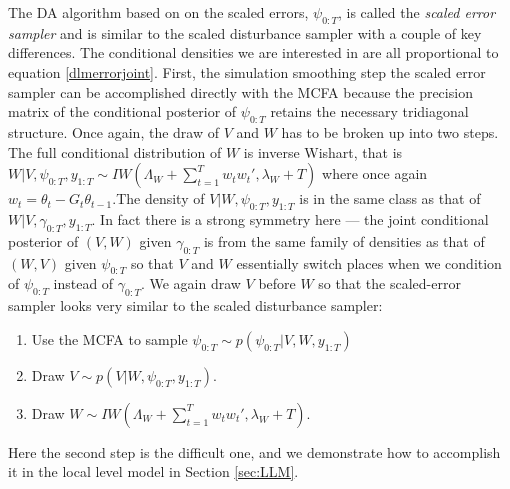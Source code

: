 \documentclass{article}
\begin{document}
The DA algorithm based on on the scaled errors, $\psi_{0:T}$, is called the {\it scaled error sampler} and is similar to the scaled disturbance sampler with a couple of key differences. The conditional densities we are interested in are all proportional to equation \eqref{dlmerrorjoint}. First, the simulation smoothing step the scaled error sampler can be accomplished directly with the MCFA because the precision matrix of the conditional posterior of $\psi_{0:T}$ retains the necessary tridiagonal structure. Once again, the draw of $V$ and $W$ has to be broken up into two steps. The full conditional distribution of $W$ is inverse Wishart, that is $W|V,\psi_{0:T},y_{1:T} \sim IW\left(\Lambda_W + \sum_{t=1}^Tw_tw_t',\lambda_{W} + T\right)$ where once again $w_t = \theta_t - G_t\theta_{t-1}$.The density of $V|W,\psi_{0:T},y_{1:T}$ is in the same class as that of $W|V,\gamma_{0:T},y_{1:T}$. In fact there is a strong symmetry here --- the joint conditional posterior of $(V,W)$ given $\gamma_{0:T}$ is from the same family of densities as that of $(W,V)$ given $\psi_{0:T}$ so that $V$ and $W$ essentially switch places when we condition of $\psi_{0:T}$ instead of $\gamma_{0:T}$. We again draw $V$ before $W$ so that the scaled-error sampler looks very similar to the scaled disturbance sampler: 
\begin{enumerate}
\item Use the MCFA to sample $\psi_{0:T} \sim  p(\psi_{0:T}|V,W,y_{1:T})$
\item Draw $V \sim p(V|W,\psi_{0:T},y_{1:T})$.
\item Draw $W \sim IW\left(\Lambda_W + \sum_{t=1}^Tw_tw_t',\lambda_{W} + T\right)$.
\end{enumerate}
Here the second step is the difficult one, and we demonstrate how to accomplish it in the local level model in Section \ref{sec:LLM}.
\end{document}
